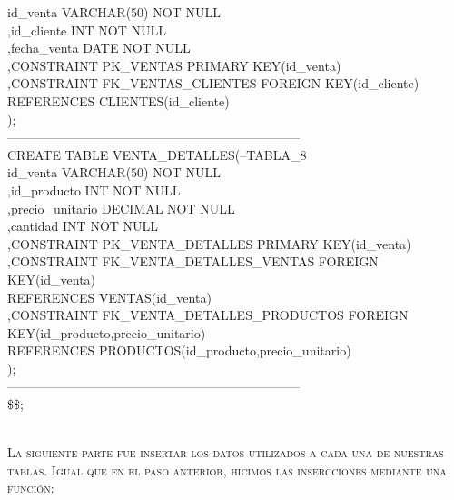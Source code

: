 \documentclass[10pt]{report}
\begin{document}
\begin{flushleft}
		 id\_venta    VARCHAR(50)	    NOT NULL\\
		,id\_cliente  INT				NOT NULL\\
		,fecha\_venta DATE NOT NULL\\
		,CONSTRAINT PK\_VENTAS PRIMARY KEY(id\_venta)\\
		,CONSTRAINT FK\_VENTAS\_CLIENTES FOREIGN KEY(id\_cliente)\\
		REFERENCES CLIENTES(id\_cliente)\\
	);\\
	---------------------------------------------------------------------\\
	CREATE TABLE VENTA\_DETALLES(--TABLA\_8\\
		 id\_venta 	        VARCHAR(50)   NOT NULL\\
		,id\_producto 	    INT			  NOT NULL\\
		,precio\_unitario 	DECIMAL		  NOT NULL\\
		,cantidad			INT			  NOT NULL\\
		,CONSTRAINT PK\_VENTA\_DETALLES PRIMARY KEY(id\_venta)\\
		,CONSTRAINT FK\_VENTA\_DETALLES\_VENTAS FOREIGN\\ KEY(id\_venta)\\
		REFERENCES VENTAS(id\_venta)\\
		,CONSTRAINT FK\_VENTA\_DETALLES\_PRODUCTOS FOREIGN\\ KEY(id\_producto,precio\_unitario)\\
		REFERENCES PRODUCTOS(id\_producto,precio\_unitario)\\
	);\\
	---------------------------------------------------------------------\\
\$\$;
    
     \end{flushleft} 
    
    
   {\large{\textsc{ \\La siguiente parte fue insertar los datos utilizados a cada una de nuestras tablas. Igual que en el paso anterior, hicimos las insercciones mediante una función:\\}}}
        
\end{document}
